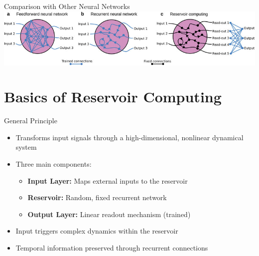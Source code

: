 \documentclass{beamer}
\begin{document}
\begin{frame}{Comparison with Other Neural Networks}
\includegraphics[width=1.0\linewidth]{figures/rc_difference_with others.png}
\caption{Illustration of (a) a feedforward neural network, (b) a recurrent neural network, and (c) a reservoir computing system}
\end{frame}

\section{Basics of Reservoir Computing}

\begin{frame}{General Principle}
\begin{itemize}
\item Transforms input signals through a high-dimensional, nonlinear dynamical system
\item Three main components:
    \begin{itemize}
    \item \textbf{Input Layer:} Maps external inputs to the reservoir 
    \item \textbf{Reservoir:} Random, fixed recurrent network
    \item \textbf{Output Layer:} Linear readout mechanism (trained)
    \end{itemize}
\item Input triggers complex dynamics within the reservoir
\item Temporal information preserved through recurrent connections
\end{itemize}
\end{frame}
\end{document}
